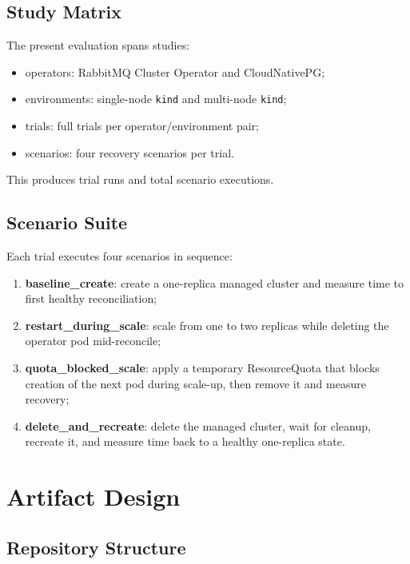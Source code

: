 \documentclass[sigconf,screen]{acmart}
\begin{document}
\subsection{Study Matrix}

The present evaluation spans \RUPStudyCount{} studies:

\begin{itemize}
  \item operators: RabbitMQ Cluster Operator and CloudNativePG;
  \item environments: single-node \texttt{kind} and multi-node \texttt{kind};
  \item trials: \RUPTrialCount{} full trials per operator/environment pair;
  \item scenarios: four recovery scenarios per trial.
\end{itemize}

This produces \RUPTotalTrials{} trial runs and \RUPScenarioExecutions{} total
scenario executions.

\subsection{Scenario Suite}

Each trial executes four scenarios in sequence:

\begin{enumerate}
  \item \textbf{baseline\_create}: create a one-replica managed cluster and
  measure time to first healthy reconciliation;
  \item \textbf{restart\_during\_scale}: scale from one to two replicas while
  deleting the operator pod mid-reconcile;
  \item \textbf{quota\_blocked\_scale}: apply a temporary ResourceQuota that
  blocks creation of the next pod during scale-up, then remove it and measure
  recovery;
  \item \textbf{delete\_and\_recreate}: delete the managed cluster, wait for
  cleanup, recreate it, and measure time back to a healthy one-replica state.
\end{enumerate}

\section{Artifact Design}

\subsection{Repository Structure}
\end{document}

